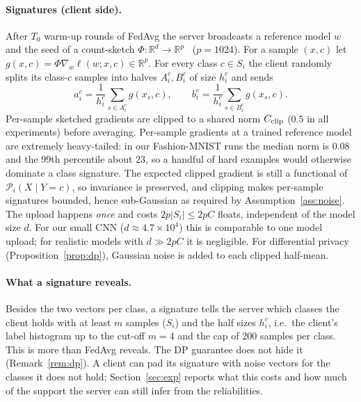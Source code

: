 \documentclass[pdflatex,sn-apa]{sn-jnl}
\theoremstyle{thmstyleone}
\theoremstyle{thmstylethree}
\newcommand{\R}{\mathbb{R}}
\newcommand{\cP}{\mathcal{P}}
\begin{document}
\paragraph{Signatures (client side).}
After $T_0$ warm-up rounds of FedAvg the server broadcasts a reference model $w$ and the seed of a count-sketch $\Phi:\R^d\to\R^p$~\citep{charikar2002countsketch,weinberger2009hashing} ($p=1024$). For a sample $(x,c)$ let $g(x,c)=\Phi\nabla_w\ell(w;x,c)\in\R^p$. For every class $c\in S_i$ the client randomly splits its class-$c$ samples into halves $A_i^c,B_i^c$ of size $h_i^c$ and sends
\[ a_i^c=\frac1{h_i^c}\sum_{s\in A_i^c}g(x_s,c),\qquad b_i^c=\frac1{h_i^c}\sum_{s\in B_i^c}g(x_s,c). \]
Per-sample sketched gradients are clipped to a shared norm $C_{\rm clip}$ ($0.5$ in all experiments) before averaging. Per-sample gradients at a trained reference model are extremely heavy-tailed: in our Fashion-MNIST runs the median norm is $0.08$ and the 99th percentile about $23$, so a handful of hard examples would otherwise dominate a class signature. The expected clipped gradient is still a functional of $\cP_i(X\mid Y=c)$, so invariance is preserved, and clipping makes per-sample signatures bounded, hence sub-Gaussian as required by Assumption~\ref{ass:noise}. The upload happens \emph{once} and costs $2p|S_i|\le 2pC$ floats, independent of the model size $d$. For our small CNN ($d\approx4.7\times10^4$) this is comparable to one model upload; for realistic models with $d\gg 2pC$ it is negligible. For differential privacy (Proposition~\ref{prop:dp}), Gaussian noise is added to each clipped half-mean.

\paragraph{What a signature reveals.} Besides the two vectors per class, a signature tells the server which classes the client holds with at least $m$ samples ($S_i$) and the half sizes $h_i^c$, i.e.\ the client's label histogram up to the cut-off $m=4$ and the cap of 200 samples per class. This is more than FedAvg reveals. The DP guarantee does not hide it (Remark~\ref{rem:dp}). A client can pad its signature with noise vectors for the classes it does not hold; Section~\ref{sec:exp} reports what this costs and how much of the support the server can still infer from the reliabilities.
\end{document}
